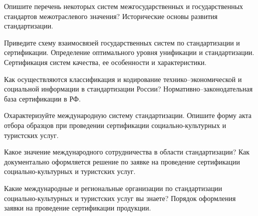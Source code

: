 \documentclass[
	14pt,
	a4paper,
	]
	{scrartcl}
\begin{document}
\vfill

\newpage


\shapk
{}
\setcounter{zad}{0}

\vfill
\z Опишите перечень некоторых систем межгосударственных и государственных стандартов межотраслевого значения?
 \vfill
\z Исторические основы развития стандартизации.
 \vfill

\vfill

\newpage


\shapk
{}
\setcounter{zad}{0}

\vfill
\z Приведите схему взаимосвязей государственных систем по стандартизации и сертификации. Определение оптимального уровня унификации и стандартизации.
 \vfill
\z Сертификация систем качества, ее особенности и характеристики.
 \vfill

\vfill

\newpage


\shapk
{}
\setcounter{zad}{0}

\vfill
\z Как осуществляются классификация и кодирование технико–экономической и социальной информации в стандартизации России?
 \vfill
\z Нормативно–законодательная база сертификации в РФ.
 \vfill

\vfill

\newpage


\shapk
{}
\setcounter{zad}{0}

\vfill
\z Охарактеризуйте международную систему стандартизации.
 \vfill
\z Опишите форму акта отбора образцов при проведении сертификации социально-культурных и туристских услуг.
 \vfill

\vfill

\newpage


\shapk
{}
\setcounter{zad}{0}

\vfill
\z Какое значение международного сотрудничества в области стандартизации?
 \vfill
\z Как документально оформляется решение по заявке на проведение сертификации социально-культурных и туристских услуг.
 \vfill

\vfill

\newpage


\shapk
{}
\setcounter{zad}{0}

\vfill
\z Какие международные и региональные организации по стандартизации социально-культурных и туристских услуг вы знаете?
 \vfill
\z Порядок оформления заявки на проведение сертификации продукции.
 \vfill
\end{document}
